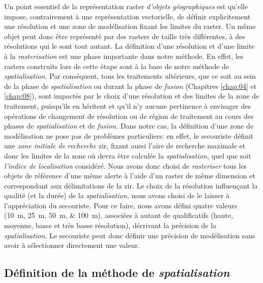 Un point essentiel de la représentation raster \emph{d'objets
  géographiques} est qu'elle impose, contrairement à une
représentation vectorielle, de définir explicitement une résolution et
une zone de modélisation fixant les limites du raster. Un même objet
peut donc être représenté par des rasters de taille très différentes,
à des résolutions qui le sont tout autant. La définition d'une
résolution et d'une limite à la \emph{rasterisation} est une phase
importante dans notre méthode. En effet, les rasters construits lors
de cette étape sont à la base de notre méthode de
\emph{spatialisation.}  Par conséquent, tous les traitements
ultérieurs, que ce soit au sein de la phase de \emph{spatialisation}
ou durant la phase de \emph{fusion} (Chapitres \ref{chap:04} et
\ref{chap:08}), sont impactés par le choix d'une résolution et des
limites de la zone de traitement, puisqu'ils en héritent et qu'il n'y
aucune pertinence à envisager des opérations de changement de
résolution ou de région de traitement au cours des phases de
\emph{spatialisation} et de \emph{fusion.} Dans notre cas, la
définition d'une zone de modélisation ne pose pas de problèmes
particuliers: en effet, le secouriste définit une \emph{zone initiale
  de recherche} \ac{zir}, fixant aussi l'aire de recherche maximale et
donc les limites de la zone où devra être calculée la
\emph{spatialisation,} quel que soit \emph{l'indice de localisation}
considéré. Nous avons donc choisi de \emph{rasteriser} tous les objets
de référence d'une même alerte à l'aide d'un raster de même dimension
et correspondant aux délimitations de la \ac{zir}. Le choix de la
résolution influençant la qualité (et la durée) de la
\emph{spatialisation,} nous avons choisi de le laisser à
l'appréciation du secouriste. Pour ce faire, nous avons défini quatre
valeurs (\SIlist{10;25;50;100}{\meter}), associées à autant de
qualificatifs (haute, moyenne, basse et très basse résolution),
décrivant la précision de la \emph{spatialisation.}  Le secouriste
peut donc définir une précision de modélisation sans avoir à
sélectionner directement une valeur.

\subsection{Définition de la méthode de \emph{spatialisation}}

